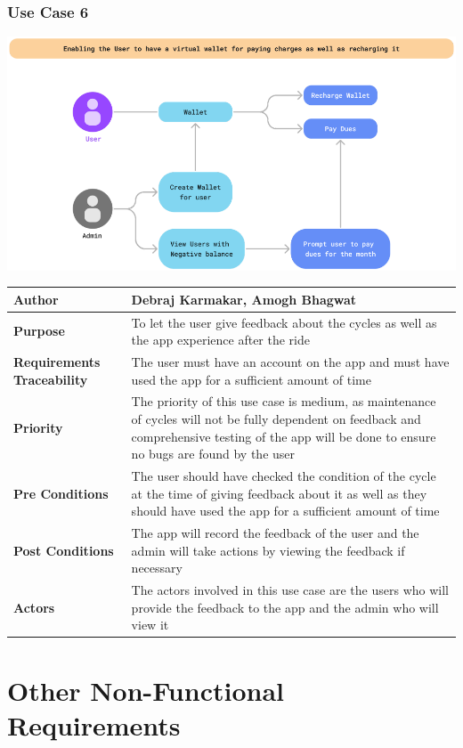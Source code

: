 \documentclass{scrreprt}
\begin{document}
\subsection{Use Case 6}
\begin{center}
\includegraphics*[scale=0.5]{usecase-6.png}
\begin{tabular}{|l|p{10cm}|}
    \hline
    \textbf{Author} & Debraj Karmakar, Amogh Bhagwat\\
    \hline
    \textbf{Purpose} & To let the user give feedback about the cycles as well as the app experience after the ride \\
    \hline
    \textbf{Requirements Traceability} & The user must have an account on the app and must have used the app for a sufficient amount of time\\
    \hline
    \textbf{Priority} & The priority of this use case is medium, as maintenance of cycles will not be fully dependent on feedback and comprehensive testing of the app will be done to ensure no bugs are found by the user\\
    \hline
    \textbf{Pre Conditions} & The user should have checked the condition of the cycle at the time of giving feedback about it as well as they should have used the app for a sufficient amount of time\\
    \hline
    \textbf{Post Conditions} & The app will record the feedback of the user and the admin will take actions by viewing the feedback if necessary\\
    \hline
    \textbf{Actors} & The actors involved in this use case are the users who will provide the feedback to the app and the admin who will view it\\
    \hline
\end{tabular}
\end{center}

\chapter{Other Non-Functional Requirements}
\end{document}
